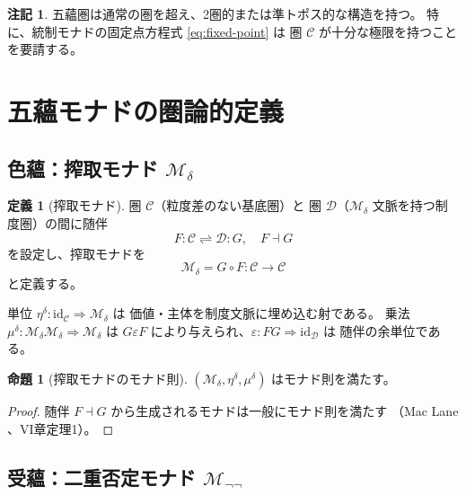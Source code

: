 \documentclass[11pt,a4paper]{article}
\theoremstyle{definition}
\newtheorem{definition}{定義}[section]
\newtheorem{proposition}{命題}[section]
\newtheorem{remark}{注記}[section]
\newcommand{\id}{\mathrm{id}}
\newcommand{\Mdelta}{\mathcal{M}_{\delta}}
\newcommand{\Mneg}{\mathcal{M}_{\neg\neg}}
\begin{document}
\begin{remark}
五蘊圏は通常の圏を超え、2圏的または準トポス的な構造を持つ。
特に、統制モナドの固定点方程式 \eqref{eq:fixed-point} は
圏 $\mathcal{C}$ が十分な極限を持つことを要請する。
\end{remark}

\section{五蘊モナドの圏論的定義}

\subsection{色蘊：搾取モナド \texorpdfstring{$\Mdelta$}{M-delta}}

\begin{definition}[搾取モナド]
圏 $\mathcal{C}$（粒度差のない基底圏）と
圏 $\mathcal{D}$（$\Mdelta$ 文脈を持つ制度圏）の間に随伴
\begin{equation}
F : \mathcal{C} \rightleftharpoons \mathcal{D} : G, \quad F \dashv G
\end{equation}
を設定し、搾取モナドを
\begin{equation}
\Mdelta = G \circ F : \mathcal{C} \to \mathcal{C}
\end{equation}
と定義する。

単位 $\eta^\delta : \id_{\mathcal{C}} \Rightarrow \Mdelta$ は
価値・主体を制度文脈に埋め込む射である。
乗法 $\mu^\delta : \Mdelta\Mdelta \Rightarrow \Mdelta$ は
$G\varepsilon F$ により与えられ、$\varepsilon : FG \Rightarrow \id_{\mathcal{D}}$ は
随伴の余単位である。
\end{definition}

\begin{proposition}[搾取モナドのモナド則]
$(\Mdelta, \eta^\delta, \mu^\delta)$ はモナド則を満たす。
\end{proposition}
\begin{proof}
随伴 $F \dashv G$ から生成されるモナドは一般にモナド則を満たす
（Mac Lane \cite{MacLane1971}、VI章定理1）。
\end{proof}

\subsection{受蘊：二重否定モナド \texorpdfstring{$\Mneg$}{M-negneg}}
\end{document}
